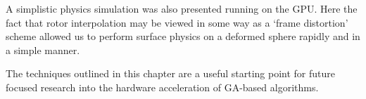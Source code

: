 A simplistic physics simulation was also presented running on the GPU. Here the
fact that rotor interpolation may be viewed in some way as a `frame distortion' scheme
allowed us to perform surface physics on a deformed sphere rapidly and in a simple manner.

The techniques outlined in this chapter are a useful starting point for
future focused research into the hardware acceleration of GA-based algorithms.

